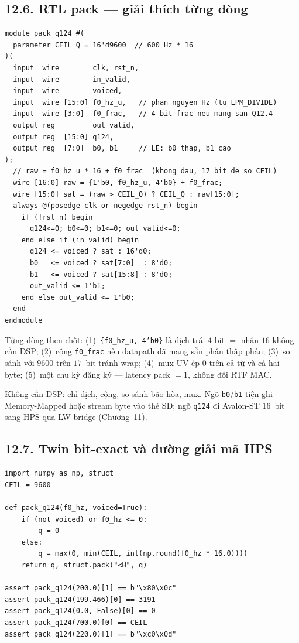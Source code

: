 \subsection*{12.6. RTL pack --- giải thích từng dòng}

\begin{verbatim}
module pack_q124 #(
  parameter CEIL_Q = 16'd9600  // 600 Hz * 16
)(
  input  wire        clk, rst_n,
  input  wire        in_valid,
  input  wire        voiced,
  input  wire [15:0] f0_hz_u,   // phan nguyen Hz (tu LPM_DIVIDE)
  input  wire [3:0]  f0_frac,   // 4 bit frac neu mang san Q12.4
  output reg         out_valid,
  output reg  [15:0] q124,
  output reg  [7:0]  b0, b1     // LE: b0 thap, b1 cao
);
  // raw = f0_hz_u * 16 + f0_frac  (khong dau, 17 bit de so CEIL)
  wire [16:0] raw = {1'b0, f0_hz_u, 4'b0} + f0_frac;
  wire [15:0] sat = (raw > CEIL_Q) ? CEIL_Q : raw[15:0];
  always @(posedge clk or negedge rst_n) begin
    if (!rst_n) begin
      q124<=0; b0<=0; b1<=0; out_valid<=0;
    end else if (in_valid) begin
      q124 <= voiced ? sat : 16'd0;
      b0   <= voiced ? sat[7:0]  : 8'd0;
      b1   <= voiced ? sat[15:8] : 8'd0;
      out_valid <= 1'b1;
    end else out_valid <= 1'b0;
  end
endmodule
\end{verbatim}

Từng dòng then chốt: (1)~\texttt{\{f0\_hz\_u, 4'b0\}} là dịch trái $4$ bit $=$ nhân $16$ không cần DSP; (2)~cộng \texttt{f0\_frac} nếu datapath đã mang sẵn phần thập phân; (3)~so sánh với $9600$ trên $17$~bit tránh wrap; (4)~mux UV ép $0$ trên cả từ và cả hai byte; (5)~một chu kỳ đăng ký --- latency pack $=1$, không đổi RTF MAC.

Không cần DSP: chỉ dịch, cộng, so sánh bão hòa, mux. Ngõ \texttt{b0}/\texttt{b1} tiện ghi Memory-Mapped hoặc stream byte vào thẻ SD; ngõ \texttt{q124} đi Avalon-ST $16$~bit sang HPS qua LW bridge (Chương~11).

\subsection*{12.7. Twin bit-exact và đường giải mã HPS}

\begin{verbatim}
import numpy as np, struct
CEIL = 9600

def pack_q124(f0_hz, voiced=True):
    if (not voiced) or f0_hz <= 0:
        q = 0
    else:
        q = max(0, min(CEIL, int(np.round(f0_hz * 16.0))))
    return q, struct.pack("<H", q)

assert pack_q124(200.0)[1] == b"\x80\x0c"
assert pack_q124(199.466)[0] == 3191
assert pack_q124(0.0, False)[0] == 0
assert pack_q124(700.0)[0] == CEIL
assert pack_q124(220.0)[1] == b"\xc0\x0d"
\end{verbatim}


